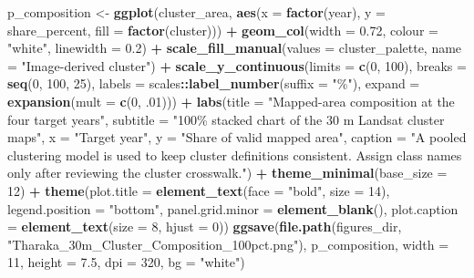 \documentclass[
]{article}
\newenvironment{Shaded}{\begin{snugshade}}{\end{snugshade}}
\newcommand{\AttributeTok}[1]{\textcolor[rgb]{0.13,0.29,0.53}{#1}}
\newcommand{\DecValTok}[1]{\textcolor[rgb]{0.00,0.00,0.81}{#1}}
\newcommand{\FloatTok}[1]{\textcolor[rgb]{0.00,0.00,0.81}{#1}}
\newcommand{\FunctionTok}[1]{\textcolor[rgb]{0.13,0.29,0.53}{\textbf{#1}}}
\newcommand{\NormalTok}[1]{#1}
\newcommand{\OtherTok}[1]{\textcolor[rgb]{0.56,0.35,0.01}{#1}}
\newcommand{\SpecialCharTok}[1]{\textcolor[rgb]{0.81,0.36,0.00}{\textbf{#1}}}
\newcommand{\StringTok}[1]{\textcolor[rgb]{0.31,0.60,0.02}{#1}}
\begin{document}
\begin{Shaded}
\begin{Highlighting}[]
\NormalTok{p\_composition }\OtherTok{\textless{}{-}} \FunctionTok{ggplot}\NormalTok{(cluster\_area, }\FunctionTok{aes}\NormalTok{(}\AttributeTok{x =} \FunctionTok{factor}\NormalTok{(year), }\AttributeTok{y =}\NormalTok{ share\_percent, }\AttributeTok{fill =} \FunctionTok{factor}\NormalTok{(cluster))) }\SpecialCharTok{+}
  \FunctionTok{geom\_col}\NormalTok{(}\AttributeTok{width =} \FloatTok{0.72}\NormalTok{, }\AttributeTok{colour =} \StringTok{"white"}\NormalTok{, }\AttributeTok{linewidth =} \FloatTok{0.2}\NormalTok{) }\SpecialCharTok{+}
  \FunctionTok{scale\_fill\_manual}\NormalTok{(}\AttributeTok{values =}\NormalTok{ cluster\_palette, }\AttributeTok{name =} \StringTok{"Image{-}derived cluster"}\NormalTok{) }\SpecialCharTok{+}
  \FunctionTok{scale\_y\_continuous}\NormalTok{(}\AttributeTok{limits =} \FunctionTok{c}\NormalTok{(}\DecValTok{0}\NormalTok{, }\DecValTok{100}\NormalTok{), }\AttributeTok{breaks =} \FunctionTok{seq}\NormalTok{(}\DecValTok{0}\NormalTok{, }\DecValTok{100}\NormalTok{, }\DecValTok{25}\NormalTok{), }\AttributeTok{labels =}\NormalTok{ scales}\SpecialCharTok{::}\FunctionTok{label\_number}\NormalTok{(}\AttributeTok{suffix =} \StringTok{"\%"}\NormalTok{), }\AttributeTok{expand =} \FunctionTok{expansion}\NormalTok{(}\AttributeTok{mult =} \FunctionTok{c}\NormalTok{(}\DecValTok{0}\NormalTok{, .}\DecValTok{01}\NormalTok{))) }\SpecialCharTok{+}
  \FunctionTok{labs}\NormalTok{(}\AttributeTok{title =} \StringTok{"Mapped{-}area composition at the four target years"}\NormalTok{,}
       \AttributeTok{subtitle =} \StringTok{"100\% stacked chart of the 30 m Landsat cluster maps"}\NormalTok{,}
       \AttributeTok{x =} \StringTok{"Target year"}\NormalTok{, }\AttributeTok{y =} \StringTok{"Share of valid mapped area"}\NormalTok{,}
       \AttributeTok{caption =} \StringTok{"A pooled clustering model is used to keep cluster definitions consistent. Assign class names only after reviewing the cluster crosswalk."}\NormalTok{) }\SpecialCharTok{+}
  \FunctionTok{theme\_minimal}\NormalTok{(}\AttributeTok{base\_size =} \DecValTok{12}\NormalTok{) }\SpecialCharTok{+}
  \FunctionTok{theme}\NormalTok{(}\AttributeTok{plot.title =} \FunctionTok{element\_text}\NormalTok{(}\AttributeTok{face =} \StringTok{"bold"}\NormalTok{, }\AttributeTok{size =} \DecValTok{14}\NormalTok{), }\AttributeTok{legend.position =} \StringTok{"bottom"}\NormalTok{,}
        \AttributeTok{panel.grid.minor =} \FunctionTok{element\_blank}\NormalTok{(), }\AttributeTok{plot.caption =} \FunctionTok{element\_text}\NormalTok{(}\AttributeTok{size =} \DecValTok{8}\NormalTok{, }\AttributeTok{hjust =} \DecValTok{0}\NormalTok{))}
\FunctionTok{ggsave}\NormalTok{(}\FunctionTok{file.path}\NormalTok{(figures\_dir, }\StringTok{"Tharaka\_30m\_Cluster\_Composition\_100pct.png"}\NormalTok{), p\_composition, }\AttributeTok{width =} \DecValTok{11}\NormalTok{, }\AttributeTok{height =} \FloatTok{7.5}\NormalTok{, }\AttributeTok{dpi =} \DecValTok{320}\NormalTok{, }\AttributeTok{bg =} \StringTok{"white"}\NormalTok{)}
\end{Highlighting}
\end{Shaded}
\end{document}
